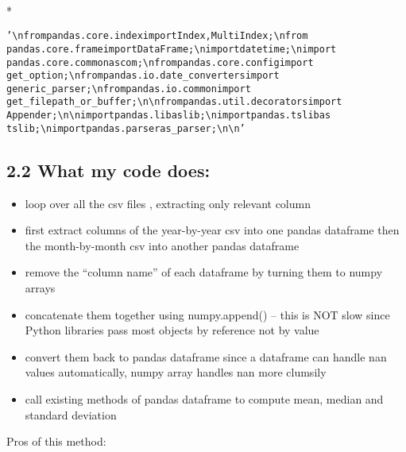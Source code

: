 \documentclass[letterpaper,10pt,english]{/usr/local/lib/python2.7/dist-packages/sphinx/texinputs/sphinxhowto}
\def\smaller{\fontsize{9.5pt}{9.5pt}\selectfont}
\newenvironment{InvisibleVerbatim}
        {\begin{mdframed}[leftmargin=0.1\linewidth,innerleftmargin=3pt,innerrightmargin=3pt, userdefinedwidth=1\linewidth, linewidth=0pt, linecolor=white, usetwoside=false]}
        {\end{mdframed}}
\begin{document}
                \makebox[0.1\linewidth]{\smaller\hfill\tt\color{nbframe-out-prompt}Out\hspace{4pt}{[}4{]}:\hspace{4pt}}\\*
                \vspace{-2.55\baselineskip}\begin{InvisibleVerbatim}
                \vspace{-0.5\baselineskip}
\begin{alltt}'\textbackslash{}nfrom pandas.core.index import Index, MultiIndex;\textbackslash{}nfrom
pandas.core.frame import DataFrame;\textbackslash{}nimport datetime;\textbackslash{}nimport
pandas.core.common as com;\textbackslash{}nfrom pandas.core.config import
get\_option;\textbackslash{}nfrom pandas.io.date\_converters import
generic\_parser;\textbackslash{}nfrom pandas.io.common import
get\_filepath\_or\_buffer;\textbackslash{}n\textbackslash{}nfrom pandas.util.decorators import
Appender;\textbackslash{}n\textbackslash{}nimport pandas.lib as lib;\textbackslash{}nimport pandas.tslib as
tslib;\textbackslash{}nimport pandas.parser as \_parser;\textbackslash{}n\textbackslash{}n'\end{alltt}

            \end{InvisibleVerbatim}
            
        
    
\subsection{2.2 What my code does:}\begin{itemize}
\itemsep1pt\parskip0pt
\item
  loop over all the csv files , extracting only relevant column
\item
  first extract columns of the year-by-year csv into one pandas
  dataframe then the month-by-month csv into another pandas dataframe
\item
  remove the ``column name'' of each dataframe by turning them to numpy
  arrays
\item
  concatenate them together using numpy.append() -- this is NOT slow
  since Python libraries pass most objects by reference not by value
\item
  convert them back to pandas dataframe since a dataframe can handle nan
  values automatically, numpy array handles nan more clumsily
\item
  call existing methods of pandas dataframe to compute mean, median and
  standard deviation
\end{itemize}Pros of this method:
\end{document}

